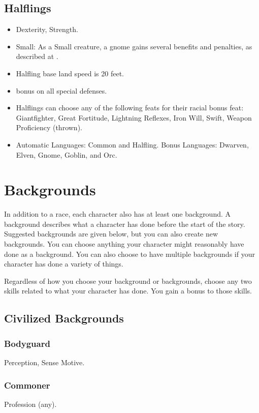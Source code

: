 \subsection{Halflings}
\begin{itemize}
\item {} Dexterity,  Strength.
\item Small: As a Small creature, a gnome gains several benefits and penalties, as described at .
\item Halfling base land speed is 20 feet.
\item {} bonus on all special defenses.
\item Halflings can choose any of the following feats for their racial bonus feat: Giantfighter, Great Fortitude, Lightning Reflexes, Iron Will, Swift, Weapon Proficiency (thrown).
\item Automatic Languages: Common and Halfling. Bonus Languages: Dwarven, Elven, Gnome, Goblin, and Orc.
\end{itemize}

\section{Backgrounds}
In addition to a race, each character also has at least one background. A background describes what a character has done before the start of the story. Suggested backgrounds are given below, but you can also create new backgrounds. You can choose anything your character might reasonably have done as a background. You can also choose to have multiple backgrounds if your character has done a variety of things.

Regardless of how you choose your background or backgrounds, choose any two skills related to what your character has done. You gain a  bonus to those skills.

\subsection{Civilized Backgrounds}

\subsubsection{Bodyguard}
 Perception, Sense Motive.

\subsubsection{Commoner}
 Profession (any).

